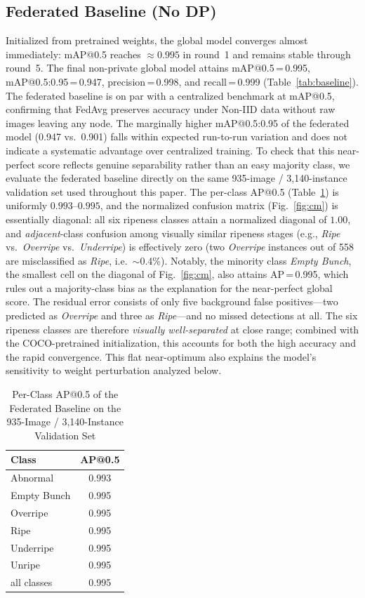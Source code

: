 \documentclass[conference]{IEEEtran}
\begin{document}
\subsection{Federated Baseline (No DP)}
Initialized from pretrained weights, the global model converges almost
immediately: mAP@0.5 reaches $\approx 0.995$ in round~1 and remains stable
through round~5. The final non-private global model attains
mAP@0.5\,=\,0.995, mAP@0.5:0.95\,=\,0.947, precision\,=\,0.998, and
recall\,=\,0.999 (Table~\ref{tab:baseline}). The federated baseline is on
par with a centralized benchmark at mAP@0.5, confirming that FedAvg preserves
accuracy under Non-IID data without raw images leaving any node. The
marginally higher mAP@0.5:0.95 of the federated model (0.947 vs.\ 0.901) falls
within expected run-to-run variation and does not indicate a systematic
advantage over centralized training. To check that this near-perfect score
reflects genuine separability rather than an easy majority class, we evaluate
the federated baseline directly on the same 935-image / 3{,}140-instance
validation set used throughout this paper. The per-class
AP@0.5 (Table~\ref{tab:perclass}) is uniformly $0.993$--$0.995$, and the
normalized confusion matrix (Fig.~\ref{fig:cm}) is essentially diagonal: all
six ripeness classes attain a normalized diagonal of $1.00$, and
\emph{adjacent}-class confusion among visually similar ripeness stages (e.g.,
\emph{Ripe} vs.\ \emph{Overripe} vs.\ \emph{Underripe}) is effectively zero
(two \emph{Overripe} instances out of 558 are misclassified as \emph{Ripe},
i.e.\ $\sim$0.4\%). Notably, the minority class \emph{Empty Bunch}, the
smallest cell on the diagonal of Fig.~\ref{fig:cm}, also attains
AP\,=\,0.995, which rules out a majority-class bias as the explanation for
the near-perfect global score. The residual error consists of only five
background false positives---two predicted as \emph{Overripe} and three as
\emph{Ripe}---and no missed detections at all. The six ripeness classes are
therefore \emph{visually well-separated} at close range; combined with the
COCO-pretrained initialization, this accounts for both the high accuracy and
the rapid convergence. This flat near-optimum also explains the model's
sensitivity to weight perturbation analyzed below.

\begin{table}[t]
\caption{Per-Class AP@0.5 of the Federated Baseline on the 935-Image /
3{,}140-Instance Validation Set}
\label{tab:perclass}
\centering
\begin{tabular}{lc}
\toprule
\textbf{Class} & \textbf{AP@0.5} \\
\midrule
Abnormal     & 0.993 \\
Empty Bunch  & 0.995 \\
Overripe     & 0.995 \\
Ripe         & 0.995 \\
Underripe    & 0.995 \\
Unripe       & 0.995 \\
\midrule
all classes  & 0.995 \\
\bottomrule
\end{tabular}
\end{table}
\end{document}
